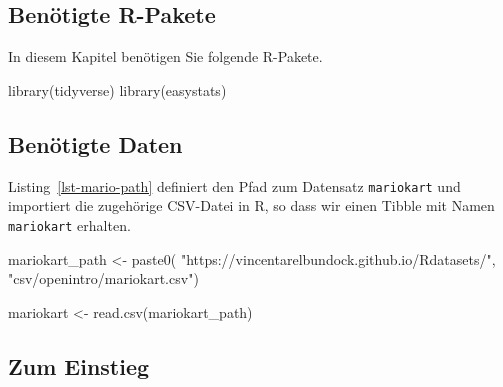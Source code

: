 \documentclass[
  letterpaper,
]{scrbook}
\newenvironment{Shaded}{\begin{snugshade}}{\end{snugshade}}
\newcommand{\FunctionTok}[1]{\textcolor[rgb]{0.28,0.35,0.67}{#1}}
\newcommand{\NormalTok}[1]{\textcolor[rgb]{0.00,0.23,0.31}{#1}}
\newcommand{\OtherTok}[1]{\textcolor[rgb]{0.00,0.23,0.31}{#1}}
\newcommand{\StringTok}[1]{\textcolor[rgb]{0.13,0.47,0.30}{#1}}
\theoremstyle{definition}
\theoremstyle{definition}
\theoremstyle{definition}
\theoremstyle{remark}
\begin{document}
\subsection{Benötigte R-Pakete}\label{benuxf6tigte-r-pakete-4}

In diesem Kapitel benötigen Sie folgende R-Pakete.

\begin{Shaded}
\begin{Highlighting}[]
\FunctionTok{library}\NormalTok{(tidyverse)}
\FunctionTok{library}\NormalTok{(easystats)}
\end{Highlighting}
\end{Shaded}

\subsection{Benötigte Daten}\label{benuxf6tigte-daten-5}

Listing~\ref{lst-mario-path} definiert den Pfad zum Datensatz
\texttt{mariokart} und importiert die zugehörige CSV-Datei in R, so dass
wir einen Tibble mit Namen \texttt{mariokart} erhalten.

\begin{Shaded}
\begin{Highlighting}[]
\NormalTok{mariokart\_path }\OtherTok{\textless{}{-}} \FunctionTok{paste0}\NormalTok{(}
  \StringTok{"https://vincentarelbundock.github.io/Rdatasets/"}\NormalTok{,}
  \StringTok{"csv/openintro/mariokart.csv"}\NormalTok{)}

\NormalTok{mariokart }\OtherTok{\textless{}{-}} \FunctionTok{read.csv}\NormalTok{(mariokart\_path)}
\end{Highlighting}
\end{Shaded}

\subsection{Zum Einstieg}\label{zum-einstieg-2}
\end{document}
